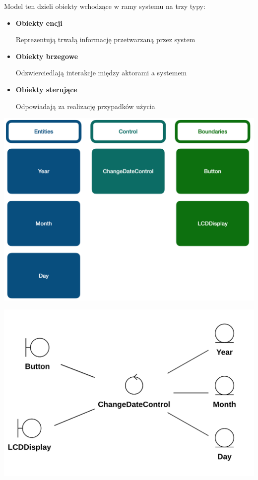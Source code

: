 \documentclass[12pt]{article}
\begin{document}
            Model ten dzieli obiekty wchodzące w ramy systemu na trzy typy:
            \begin{itemize}
                \item \textbf{Obiekty encji}

                    Reprezentują trwałą informację przetwarzaną przez system

                \item \textbf{Obiekty brzegowe}

                    Odzwierciedlają interakcje między aktorami a systemem

                \item \textbf{Obiekty sterujące}
            
                    Odpowiadają za realizację przypadków użycia        

            \end{itemize}

            \begin{center}
                \includegraphics[scale=0.40]{ooad/ecb.png}
            \end{center}

            \begin{center}
                \includegraphics[scale=0.50]{ooad/ecb-uml.png}
            \end{center}
   \newpage
   
\end{document}
